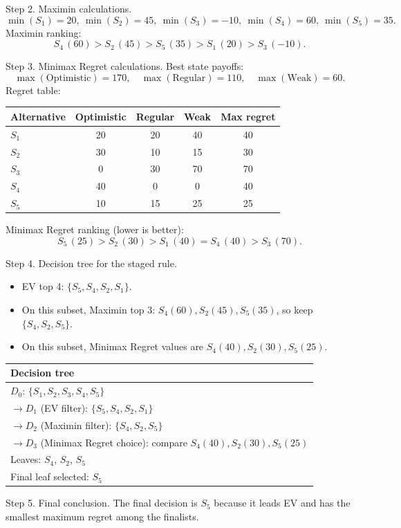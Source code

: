 \begin{ExamProblems}
		Step 2. Maximin calculations.
		\[
		\min(S_1)=20,\ \min(S_2)=45,\ \min(S_3)=-10,\ \min(S_4)=60,\ \min(S_5)=35.
		\]
		Maximin ranking:
		\[
		S_4\,(60)>S_2\,(45)>S_5\,(35)>S_1\,(20)>S_3\,(-10).
		\]

		Step 3. Minimax Regret calculations.
		Best state payoffs:
		\[
		\max(\text{Optimistic})=170,\quad \max(\text{Regular})=110,\quad \max(\text{Weak})=60.
		\]
		Regret table:
		\begin{center}
			\begin{tabular}{l c c c c}
				\toprule
				Alternative & Optimistic & Regular & Weak & Max regret \\
				\midrule
				$S_1$ & 20 & 20 & 40 & 40 \\
				$S_2$ & 30 & 10 & 15 & 30 \\
				$S_3$ & 0 & 30 & 70 & 70 \\
				$S_4$ & 40 & 0 & 0 & 40 \\
				$S_5$ & 10 & 15 & 25 & 25 \\
				\bottomrule
			\end{tabular}
		\end{center}
		Minimax Regret ranking (lower is better):
		\[
		S_5\,(25)>S_2\,(30)>S_1\,(40)=S_4\,(40)>S_3\,(70).
		\]

		Step 4. Decision tree for the staged rule.
		\begin{itemize}
			\item EV top 4: $\{S_5,S_4,S_2,S_1\}$.
			\item On this subset, Maximin top 3: $S_4(60),S_2(45),S_5(35)$, so keep $\{S_4,S_2,S_5\}$.
			\item On this subset, Minimax Regret values are $S_4(40),S_2(30),S_5(25)$.
		\end{itemize}
		\begin{center}
			\begin{tabular}{l}
				\toprule
				Decision tree \\
				\midrule
				$D_0$: $\{S_1,S_2,S_3,S_4,S_5\}$ \\
				$\rightarrow D_1$ (EV filter): $\{S_5,S_4,S_2,S_1\}$ \\
				$\rightarrow D_2$ (Maximin filter): $\{S_4,S_2,S_5\}$ \\
				$\rightarrow D_3$ (Minimax Regret choice): compare $S_4(40),S_2(30),S_5(25)$ \\
				Leaves: $S_4$, $S_2$, $S_5$ \\
				Final leaf selected: $S_5$ \\
				\bottomrule
			\end{tabular}
		\end{center}

		Step 5. Final conclusion.
		The final decision is $S_5$ because it leads EV and has the smallest maximum regret among the finalists.
	\end{ExamProblems}

